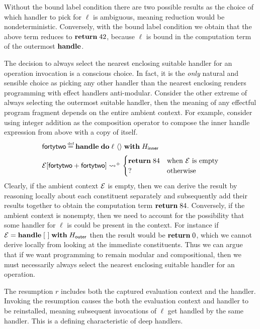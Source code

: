\documentclass[12pt,phd,lfcs,twoside,openright,logo,leftchapter,normalheadings]{infthesis}
\theoremstyle{plain}
\theoremstyle{definition}
\begin{document}
%
Without the bound label condition there are two possible results as
the choice of which handler to pick for $\ell$ is ambiguous, meaning
reduction would be nondeterministic. Conversely, with the bound label
condition we obtain that the above term reduces to $\mathbf{return}\;42$,
because $\ell$ is bound in the computation term of the outermost
$\mathbf{handle}$.
%

The decision to always select the nearest enclosing suitable handler
for an operation invocation is a conscious choice. In fact, it is the
\emph{only} natural and sensible choice as picking any other handler
than the nearest enclosing renders programming with effect handlers
anti-modular. Consider the other extreme of always selecting the
outermost suitable handler, then the meaning of any effectful program
fragment depends on the entire ambient context. For example, consider
using integer addition as the composition operator to compose the
inner handle expression from above with a copy of itself.
%
\[
  \bl
      \dec{fortytwo} \defas \Handle\;\Do\;\ell~\Unit\;\With\;H_{\mathsf{inner}} \medskip\\
      \EC[\dec{fortytwo} + \dec{fortytwo}] \reducesto^+ \begin{cases}
                                                          \Return\; 84 & \text{when $\EC$ is empty}\\
                                                          ? & \text{otherwise}
                                                        \end{cases}
  \el
\]
%
Clearly, if the ambient context $\mathcal{E}$ is empty, then we can derive the
result by reasoning locally about each constituent separately and
subsequently add their results together to obtain the computation term
$\mathbf{return}\;84$. Conversely, if the ambient context is nonempty, then we
need to account for the possibility that some handler for $\ell$ is
could be present in the context. For instance if
$\mathcal{E} = \mathbf{handle}\;[~]\;\mathbf{with}\;H_{\mathsf{outer}}$ then the result would
be $\mathbf{return}\;0$, which we cannot derive locally from looking at the
immediate constituents. Thus we can argue that if we want programming
to remain modular and compositional, then we must necessarily always
select the nearest enclosing suitable handler for an operation.
%

The resumption $r$ includes both the captured evaluation context and
the handler. Invoking the resumption causes the both the evaluation
context and handler to be reinstalled, meaning subsequent invocations
of $\ell$ get handled by the same handler. This is a defining
characteristic of deep handlers.
\end{document}
